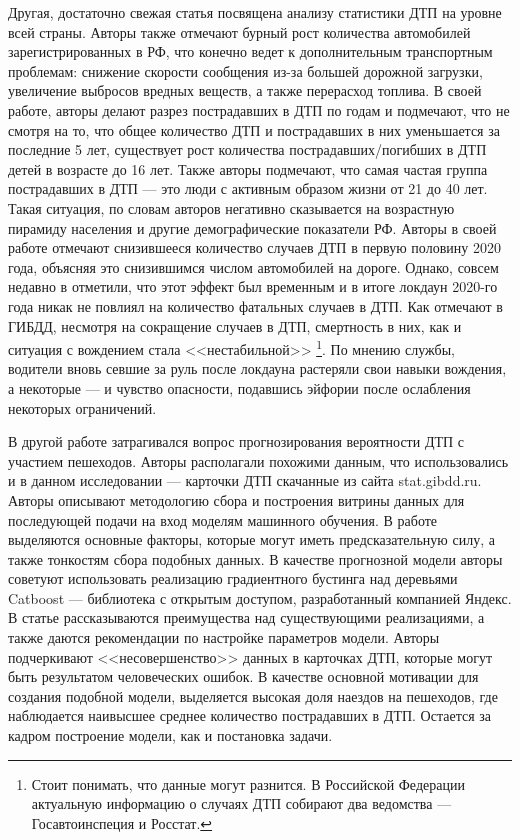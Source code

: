 \documentclass[a4paper, 14pt]{article}
\begin{document}
Другая, достаточно свежая статья \cite{klachkiva2020analiz} посвящена анализу статистики ДТП на уровне всей страны. Авторы также отмечают бурный рост количества автомобилей зарегистрированных в РФ, что конечно ведет к дополнительным транспортным проблемам: снижение скорости сообщения из-за большей дорожной загрузки, увеличение выбросов вредных веществ, а также перерасход топлива. В своей работе, авторы делают разрез пострадавших в ДТП по годам и подмечают, что не смотря на то, что общее количество ДТП и пострадавших в них уменьшается за последние 5 лет, существует рост количества пострадавших/погибших в ДТП детей в возрасте до 16 лет. Также авторы подмечают, что самая частая группа пострадавших в ДТП --- это люди с активным образом жизни от 21 до 40 лет. Такая ситуация, по словам авторов негативно сказывается на возрастную пирамиду населения и другие демографические показатели РФ. Авторы в своей работе отмечают снизившееся количество случаев ДТП в первую половину 2020 года, объясняя это снизившимся числом автомобилей на дороге. Однако, совсем недавно в \cite{rbkNews} отметили, что этот эффект был временным и в итоге локдаун 2020-го года никак не повлиял на количество фатальных случаев в ДТП. Как отмечают в ГИБДД, несмотря на сокращение случаев в ДТП, смертность в них, как и ситуация с вождением стала <<нестабильной>> \footnote{Стоит понимать, что данные могут разнится. В Российской Федерации актуальную информацию о случаях ДТП собирают два ведомства --- Госавтоинспеция и Росстат.}. По мнению службы, водители вновь севшие за руль после локдауна растеряли свои навыки вождения, а некоторые --- и чувство опасности, подавшись эйфории после ослабления некоторых ограничений.

В другой работе \cite{kuzmenko2020analysis} затрагивался вопрос прогнозирования вероятности ДТП с участием пешеходов. Авторы располагали похожими данным, что использовались и в данном исследовании --- карточки ДТП скачанные из сайта stat.gibdd.ru. Авторы описывают методологию сбора и построения витрины данных для последующей подачи на вход моделям машинного обучения. В работе выделяются основные факторы, которые могут иметь предсказательную силу, а также тонкостям сбора подобных данных. В качестве прогнозной модели авторы советуют использовать реализацию градиентного бустинга над деревьями Catboost --- библиотека с открытым доступом, разработанный компанией Яндекс. В статье рассказываются преимущества над существующими реализациями, а также даются рекомендации по настройке параметров модели. Авторы подчеркивают <<несовершенство>> данных в карточках ДТП, которые могут быть результатом человеческих ошибок. В качестве основной мотивации для создания подобной модели, выделяется высокая доля наездов на пешеходов, где наблюдается наивысшее среднее количество пострадавших в ДТП. Остается за кадром построение модели, как и постановка задачи.
\end{document}
